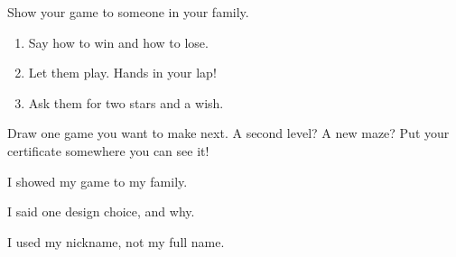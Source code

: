 
\begin{playathome}
Show your game to someone in your family.
\begin{enumerate}[leftmargin=1.4em,itemsep=2pt]
  \item Say how to win and how to lose.
  \item Let them play. Hands in your lap!
  \item Ask them for two stars and a wish.
\end{enumerate}
\end{playathome}

\begin{playathome}
Draw one game you want to make next. A second level? A new maze? Put your certificate somewhere you can see it!
\answerspace{3cm}
\end{playathome}

\begin{selfcheck}
  \item I showed my game to my family.
  \item I said one design choice, and why.
  \item I used my nickname, not my full name.
\end{selfcheck}
